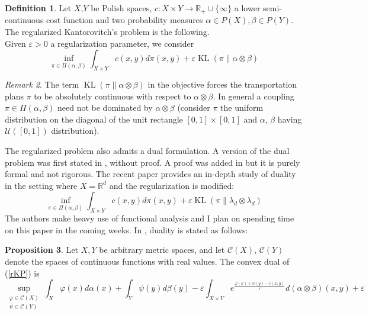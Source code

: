 \documentclass[12pt]{report}
\theoremstyle{definition}
\newtheorem{defi}{Definition}[section]
\newtheorem{prop}[defi]{Proposition}
\theoremstyle{remark}
\newtheorem{rem}[defi]{Remark}
\DeclareMathOperator{\kl}{KL}
\begin{document}
\begin{defi}
	Let $X$,$Y$ be Polish spaces, $c:X\times Y\to \mathbb R_+\cup \{\infty\}$ a lower semi-continuous cost function and two probability measures $\alpha\in P(X), \beta\in P(Y)$. The regularized Kantorovitch's problem is the following.\\
	Given $\varepsilon>0$ a regularization parameter, we consider 
	\begin{equation}\tag{Regularized KP}\label{rKP}
	\inf_{\pi\in \Pi(\alpha, \beta)} \int_{X\times Y} c(x,y) d\pi(x,y) + \varepsilon\kl(\pi\|\alpha\otimes \beta)
	\end{equation}
\end{defi}

\begin{rem}
	The term $\kl(\pi\|\alpha\otimes \beta)$ in the objective forces the transportation plans $\pi$ to be absolutely continuous with respect to $\alpha\otimes \beta$. In general a coupling $\pi\in \Pi(\alpha,\beta)$ need not be dominated by $\alpha\otimes \beta$ (consider $\pi$ the uniform distribution on the diagonal of the unit rectangle $[0,1]\times [0,1]$ and $\alpha$, $\beta$ having $\mathcal U([0,1])$ distribution).
\end{rem}

The regularized problem also admits a dual formulation. A version of the dual problem was first stated in \cite{genevay2016stochastic}, without proof. A proof was added in \cite[Proposition~4]{genevay2019entropy} but it is purely formal and not rigorous. The recent paper \cite{clason2019entropic} provides an in-depth study of duality in the setting where $X=\mathbb R^d$ and the regularization is modified:
	\begin{equation*}
	\inf_{\pi\in \Pi(\alpha, \beta)} \int_{X\times Y} c(x,y) d\pi(x,y) + \varepsilon\kl(\pi\|\lambda_d\otimes \lambda_d)
	\end{equation*}
The authors make heavy use of functional analysis and I plan on spending time on this paper in the coming weeks. In \cite{genevay2016stochastic,genevay2018sample,genevay2019entropy}, duality is stated as follows:

\begin{prop}
	Let $X,Y$ be arbitrary metric spaces, and let $\mathcal C(X)$, $\mathcal C(Y)$ denote the spaces of continuous functions with real values. The convex dual of (\ref{rKP}) is 
	\begin{equation*}\tag{Dual Reg. KP 1}\label{dualrKP}
		\sup_{\substack{\varphi \in \mathcal C(X)\\\psi \in \mathcal C(Y)}} \int_X \varphi(x) d\alpha(x) + \int_Y \psi(y) d\beta(y) -\varepsilon \int_{X\times Y} e^{\frac{\varphi(x)+\psi(y)-c(x,y)}\varepsilon} d(\alpha\otimes\beta)(x,y) + \varepsilon
	\end{equation*}
\end{prop}
\end{document}
